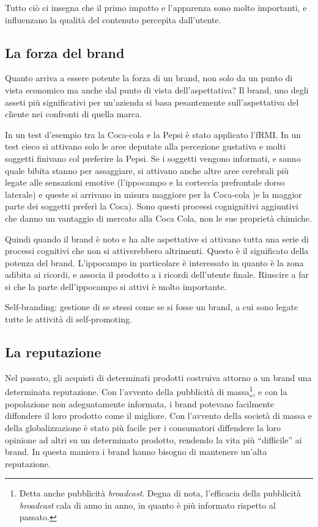 Tutto ciò ci insegna che il primo impatto e l'apparenza sono molto importanti,
e influenzano la qualità del contenuto percepita dall'utente.

\subsection{La forza del brand}

Quanto arriva a essere potente la forza di un brand, non solo da un punto di
vista economico ma anche dal punto di vista dell'aspettativa?
Il brand, uno degli asseti più significativi per un'azienda si basa
pesantemente sull'aspettativa del cliente nei confronti di quella marca.

In un test d'esempio tra la Coca-cola e la Pepsi è stato applicato l'fRMI. In
un test cieco si attivano solo le aree deputate alla percezione gustativa e
molti soggetti finivano col preferire la Pepsi. Se i soggetti vengono
informati, e sanno quale bibita stanno per assaggiare, si attivano anche altre
aree cerebrali più legate alle sensazioni emotive (l'ippocampo e la corteccia
prefrontale dorso laterale) e queste si arrivano in misura maggiore per la
Coca-cola )e la maggior parte dei soggetti preferì la Coca). Sono questi
processi cognignitivi aggiuntivi che danno un vantaggio di mercato alla Coca
Cola, non le sue proprietà chimiche.

Quindi quando il brand è noto e ha alte aspettative si attivano tutta una serie
di processi cognitivi che non si attiverebbero altrimenti. Questo è il
significato della potenza del brand. L'ippocampo in particolare è interessato
in quanto è la zona adibita ai ricordi, e associa il prodotto a i ricordi
dell'utente finale. Riuscire a far si che la parte dell'ippocampo si attivi è
molto importante.

Self-branding: gestione di se stessi come se si fosse un brand, a cui sono
legate tutte le attività di self-promoting.

\subsection{La reputazione}

Nel passato, gli acquisti di determinati prodotti costruiva attorno a un brand
una determinata reputazione. Con l'avvento della pubblicità di
massa\footnote{Detta anche pubblicità \textit{broadcast}. Degna di nota,
l'efficacia della pubblicità \textit{broadcast} cala di anno in anno, in
quanto è più informato rispetto al passato.}, e con la popolazione non
adeguatamente informata, i brand potevano facilmente diffondere il loro
prodotto come il migliore. Con l'avvento della società di massa e della
globalizzazione è stato più facile per i consumatori diffendere la loro opinione
ad altri su un determinato prodotto, rendendo la vita più ``difficile'' ai
brand. In questa maniera i brand hanno bisogno di mantenere un'alta reputazione.

